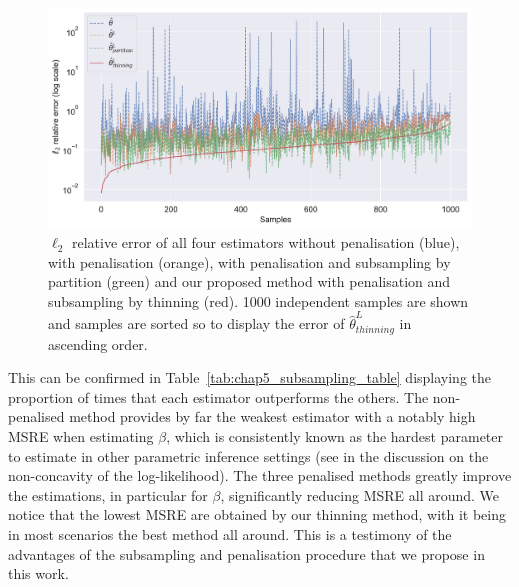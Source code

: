     \begin{figure}[!ht]
        \centering
        \includegraphics[width=1.0\textwidth]{images/chapter5/l2_error_subsampling.pdf} 
        \caption{$\ell_2$ relative error of all four estimators without penalisation (blue), with penalisation (orange), with penalisation and subsampling by partition (green) and our proposed method with penalisation and subsampling by thinning (red).
        1000 independent samples are shown and samples are sorted so to display the error of $\hat \theta^L_{thinning}$ in ascending order. 
        }
        \label{fig:chap5_l2_error_subsampling}
    \end{figure}

    This can be confirmed in Table~\ref{tab:chap5_subsampling_table} displaying the proportion of times that each estimator outperforms the others.
    The non-penalised method provides by far the weakest estimator with a notably high MSRE when estimating $\beta$, which is consistently known as the hardest parameter to estimate in other parametric inference settings (see in \textcite{Lemonnier2014} the discussion on the non-concavity of the log-likelihood).
    The three penalised methods greatly improve the estimations, in particular for $\beta$, significantly reducing MSRE all around.
    We notice that the lowest MSRE are obtained by our thinning method, with it being in most scenarios the best method all around. 
    This is a testimony of the advantages of the subsampling and penalisation procedure that we propose in this work.

